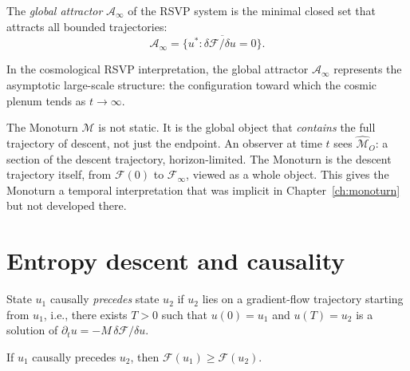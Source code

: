 \begin{definition}
  The \emph{global attractor} $\mathcal{A}_\infty$ of the RSVP
  system is the minimal closed set that attracts all bounded
  trajectories:
  \[
    \mathcal{A}_\infty
    = \overline{\{u^* : \delta\mathcal{F}/\delta u = 0\}}.
  \]
\end{definition}

\begin{proposition}
  \label{prop:attractor-cosmic}
  In the cosmological RSVP interpretation, the global attractor
  $\mathcal{A}_\infty$ represents the asymptotic large-scale
  structure: the configuration toward which the cosmic plenum
  tends as $t \to \infty$.
\end{proposition}

\begin{InterpBox}
  The Monoturn $\mathcal{M}$ is not static.
  It is the global object that \emph{contains} the full
  trajectory of descent, not just the endpoint.
  An observer at time $t$ sees $\widehat{\mathcal{M}}_O$:
  a section of the descent trajectory, horizon-limited.
  The Monoturn is the descent trajectory itself, from
  $\mathcal{F}(0)$ to $\mathcal{F}_\infty$, viewed as a
  whole object.
  This gives the Monoturn a temporal interpretation that was
  implicit in Chapter~\ref{ch:monoturn} but not developed there.
\end{InterpBox}

\section{Entropy descent and causality}

\begin{definition}
  \label{def:causal-precedence}
  State $u_1$ causally \emph{precedes} state $u_2$ if
  $u_2$ lies on a gradient-flow trajectory starting from $u_1$,
  i.e., there exists $T > 0$ such that $u(0) = u_1$ and
  $u(T) = u_2$ is a solution of $\partial_t u = -M\,\delta\mathcal{F}/\delta u$.
\end{definition}

\begin{proposition}
  \label{prop:causal-F}
  \statusproven{}
  If $u_1$ causally precedes $u_2$, then
  $\mathcal{F}(u_1) \geq \mathcal{F}(u_2)$.
\end{proposition}

